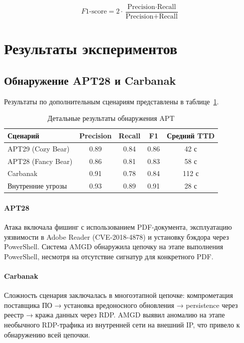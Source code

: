 \documentclass{article}
\begin{document}
\begin{equation}
    F1\text{-score} = 2 \cdot \frac{\text{Precision} \cdot \text{Recall}}{\text{Precision} + \text{Recall}}
    \label{eq:f1}
\end{equation}

\section{Результаты экспериментов}\label{sec:ch4/sect4}

\subsection{Обнаружение APT28 и Carbanak}

Результаты по дополнительным сценариям представлены в таблице~\ref{tab:detailed_results}.

\begin{table}[ht]
\centering
\caption{Детальные результаты обнаружения APT}
\label{tab:detailed_results}
\begin{tabular}{lcccc}
\toprule
Сценарий & Precision & Recall & F1 & Средний TTD \\
\midrule
APT29 (Cozy Bear) & 0.89 & 0.84 & 0.86 & 42 с \\
APT28 (Fancy Bear) & 0.86 & 0.81 & 0.83 & 58 с \\
Carbanak & 0.91 & 0.78 & 0.84 & 112 с \\
Внутренние угрозы & 0.93 & 0.89 & 0.91 & 28 с \\
\bottomrule
\end{tabular}
\end{table}

\paragraph{APT28}
Атака включала фишинг с использованием PDF-документа, эксплуатацию уязвимости в Adobe Reader (CVE-2018-4878) и установку бэкдора через PowerShell. Система AMGD обнаружила цепочку на этапе выполнения PowerShell, несмотря на отсутствие сигнатур для конкретного PDF.

\paragraph{Carbanak}
Сложность сценария заключалась в многоэтапной цепочке: компрометация поставщика ПО → установка вредоносного обновления → persistence через реестр → кража данных через RDP. AMGD выявил аномалию на этапе необычного RDP-трафика из внутренней сети на внешний IP, что привело к обнаружению всей цепочки.
\end{document}
